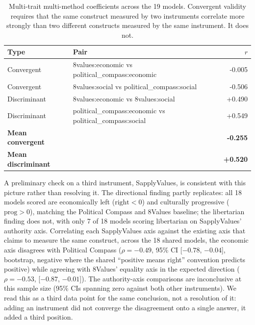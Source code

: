 \documentclass[11pt]{article}
\begin{document}
\begin{table}[H]
\centering
\caption{Multi-trait multi-method coefficients across the 19 models. Convergent validity requires that the same construct measured by two instruments correlate more strongly than two different constructs measured by the same instrument. It does not.}
\label{stab:mtmm}
\begin{tabular}{llr}
\toprule
Type & Pair & $r$ \\
\midrule
Convergent & 8values:economic vs political\_compass:economic & -0.005 \\
Convergent & 8values:social vs political\_compass:social & -0.506 \\
Discriminant & 8values:economic vs 8values:social & +0.490 \\
Discriminant & political\_compass:economic vs political\_compass:social & +0.549 \\
\midrule
\textbf{Mean convergent} & & \textbf{-0.255} \\
\textbf{Mean discriminant} & & \textbf{+0.520} \\
\bottomrule
\end{tabular}
\end{table}

A preliminary check on a third instrument, SapplyValues, is consistent with
this picture rather than resolving it. The directional finding partly
replicates: all 18 models scored are economically left ($\text{right}<0$)
and culturally progressive ($\text{prog}>0$), matching the Political
Compass and 8Values baseline; the libertarian finding does not, with only 7
of 18 models scoring libertarian on SapplyValues' authority axis.
Correlating each SapplyValues axis against the existing axis that claims to
measure the same construct, across the 18 shared models, the economic axis
disagrees with Political Compass ($\rho=-0.49$, 95\% CI [$-0.78$, $-0.04$],
bootstrap, negative where the shared ``positive means right'' convention
predicts positive) while agreeing with 8Values' equality axis in the
expected direction ($\rho=-0.53$, [$-0.87$, $-0.01$]). The authority-axis
comparisons are inconclusive at this sample size (95\% CIs spanning zero
against both other instruments). We read this as a third data point for the
same conclusion, not a resolution of it: adding an instrument did not
converge the disagreement onto a single answer, it added a third position.
\end{document}
